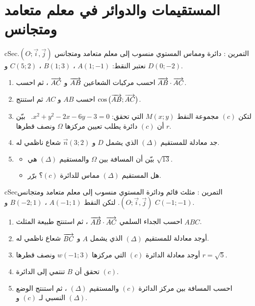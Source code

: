 \documentclass[12pt,a4paper]{article}
\newenvironment{BOX}[2]{\begin{otherlanguage}{english}\begin{arbox}{#1}{#2}}{\end{arbox}\end{otherlanguage}}
\newcounter{exo}
\newenvironment{tamrin}[1]{\stepcounter{exo}\begin{BOX}{cSec}{التمرين \theexo: #1}}{\end{BOX}}
\newenvironment{sq}{\begin{itemize}[leftmargin=2.4em,itemsep=3pt]}{\end{itemize}}
\newcommand{\qa}{\item[(أ)]}\newcommand{\qb}{\item[(ب)]}\newcommand{\qc}{\item[(جـ)]}\newcommand{\qd}{\item[(د)]}\newcommand{\qe}{\item[(هـ)]}
\begin{document}
\section{المستقيمات والدوائر في معلم متعامد ومتجانس}
\begin{tamrin}{دائرة ومماس}
المستوي منسوب إلى معلم متعامد ومتجانس $(O;\vec i,\vec j)$. نعتبر النقط: $A(1;-1)$ ، $B(1;3)$ ، $C(5;2)$ و $D(0;-2)$.
\begin{enumerate}
\item احسب مركبات الشعاعين $\overrightarrow{AB}$ و $\overrightarrow{AC}$ ، ثم احسب $\overrightarrow{AB}\cdot\overrightarrow{AC}$.
\item احسب $AB$ و $AC$ ثم استنتج $\cos\big(\overrightarrow{AB};\overrightarrow{AC}\big)$.
\item لتكن $(c)$ مجموعة النقط $M(x;y)$ التي تحقق: $x^2+y^2-2x-6y-3=0$. \ بيّن أن $(c)$ دائرة يطلب تعيين مركزها $\Omega$ ونصف قطرها $r$.
\item جد معادلة للمستقيم $(\Delta)$ الذي يشمل $D$ و $\vec n(3;2)$ شعاع ناظمي له.
\item
\begin{sq}
\qa بيّن أن المسافة بين $\Omega$ والمستقيم $(\Delta)$ هي $\sqrt{13}$.
\qb هل المستقيم $(\Delta)$ مماس للدائرة $(c)$؟ برّر.
\end{sq}
\end{enumerate}
\end{tamrin}

\begin{tamrin}{مثلث قائم ودائرة}
المستوي منسوب إلى معلم متعامد ومتجانس $(O;\vec i,\vec j)$. لتكن النقط $A(-1;1)$ ، $B(-2;1)$ و $C(-1;-1)$.
\begin{enumerate}
\item احسب الجداء السلمي $\overrightarrow{AB}\cdot\overrightarrow{AC}$ ، ثم استنتج طبيعة المثلث $ABC$.
\item أوجد معادلة للمستقيم $(\Delta)$ الذي يشمل $A$ و $\overrightarrow{BC}$ شعاع ناظمي له.
\item أوجد معادلة الدائرة $(c)$ التي مركزها $w(-1;3)$ ونصف قطرها $r=\sqrt5$.
\item تحقق أن $B$ تنتمي إلى الدائرة $(c)$.
\item احسب المسافة بين مركز الدائرة $(c)$ والمستقيم $(\Delta)$ ، ثم استنتج الوضع النسبي لـ $(c)$ و $(\Delta)$.
\end{enumerate}
\end{tamrin}
\end{document}
